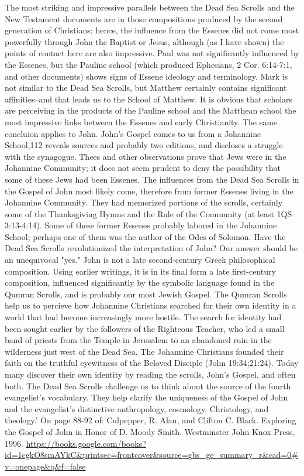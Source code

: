 \documentclass[11pt]{article}
\begin{document}
\begin{thebibliography}{37}
The most striking and impressive parallels between the Dead Sea Scrolls and the New Testament documents are in those compositions produced by the second generation of Christians; hence, the influence from the Essenes did not come most powerfully through John the Baptist or Jesus, although (as I have shown) the points of contact here are also impressive. Paul was not significantly influenced by the Essenes, but the Pauline school (which produced Ephesians, 2 Cor. 6:14-7:1, and other documents) shows signs of Essene ideology and terminology. Mark is not similar to the Dead Sea Scrolls, but Matthew certainly contains significant affinities--and that leads us to the School of Matthew. It is obvious that scholars are perceiving in the products of the Pauline school and the Matthean school the most impressive links between the Essenes and early Christianity. The same concluion applies to John. John's Gospel comes to us from a Johannine School,112 reveals sources and probably two editions, and discloses a struggle with the synagogue. Thees and other observations prove that Jews were in the Johannine Community; it does not seem prudent to deny the possibility that some of these Jews had been Essenes. The influences from the Dead Sea Scrolls in the Gospel of John most likely come, therefore from former Essenes living in the Johannine Community. They had memorized portions of the scrolls, certainly some of the Thanksgiving Hymns and the Rule of the Community (at least 1QS 3:13-4:14). Some of these former Essenes probably labored in the Johannine School; perhaps one of them was the author of the Odes of Solomon. 
Have the Dead Sea Scrolls revolutionized the interpretation of John? Our answer should be an unequivocal "yes." John is not a late second-century Greek philosophical composition. Using earlier writings, it is in its final form a late first-century composition, influenced significantly by the symbolic language found in the Qumran Scrolls, and is probably our most Jewish Gospel. The Qumran Scrolls help us to percieve how Johannine Christians searched for their own identity in a world that had become increasingly more hostile. The search for identity had been sought earlier by the followers of the Righteous Teacher, who led a small band of priests from the Temple in Jerusalem to an abandoned ruin in the wilderness just west of the Dead Sea. The Johannine Christians founded their faith on the truthful eyewitness of the Beloved Disciple (John 19:34;21:24). Today many discover their own identity by reading the scrolls, John's Gospel, and often both.
The Dead Sea Scrolls challenge us to think about the source of the fourth evangelist's vocabulary. They help clarify the uniqueness of the Gospel of John and the evangelist's distinctive anthropology, cosmology, Christology, and theology.'
On page 88-92 of: 
Culpepper, R. Alan, and Clifton C. Black. Exploring the Gospel of John in Honor of D. Moody Smith. Westminster John Knox Press, 1996.
\url{https://books.google.com/books?id=1cgkO8smAYkC&printsec=frontcover&source=gbs_ge_summary_r&cad=0#v=onepage&q&f=false}


\end{thebibliography}
\end{document}
